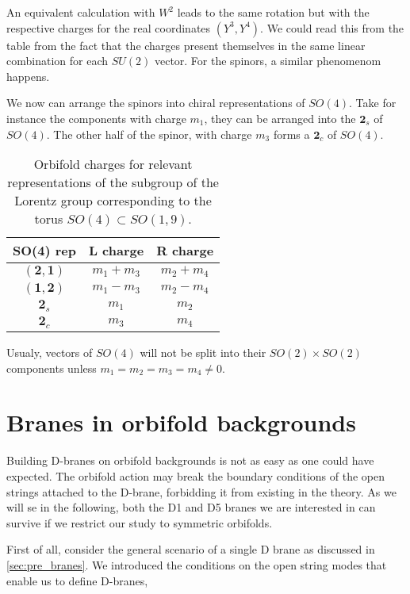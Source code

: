An equivalent calculation with $W^2$ leads to the same rotation but with the respective charges for the real coordinates $(Y^3, Y^4)$. We could read this from the table from the fact that the charges present themselves in the same linear combination for each $SU(2)$ vector. For the spinors, a similar phenomenom happens.

We now can arrange the spinors into chiral representations of $SO(4)$. Take for instance the components  with charge $m_1$, they can be arranged into the $\mathbf{2}_s$ of $SO(4)$. The other half of the spinor, with charge $m_3$ forms a $\mathbf{2}_c$ of $SO(4)$.

\begin{table}[h]
    \label{table:superimportant_orbifold_charges}
    \centering
    \begin{tabular}{ccc}
    SO(4) rep                 & L charge  & R charge  \\ \hline
    $(\mathbf{2},\mathbf{1})$ & $m_1+m_3$ & $m_2+m_4$ \\
    $(\mathbf{1},\mathbf{2})$ & $m_1-m_3$ & $m_2-m_4$ \\ \hline
    $\mathbf{2}_s$            & $m_1$     & $m_2$     \\
    $\mathbf{2}_c$            & $m_3$     & $m_4$    
\end{tabular}
\caption{Orbifold charges for relevant representations of the subgroup of the Lorentz group corresponding to the torus $SO(4)\subset SO(1,9)$.}
\end{table}

Usualy, vectors of $SO(4)$ will not be split into their $SO(2)\times SO(2)$ components unless $m_1 = m_2 = m_3 = m_4 \neq 0$.


\section{Branes in orbifold backgrounds}

Building D-branes on orbifold backgrounds is not as easy as one could have expected. The orbifold action may break the boundary conditions of the open strings attached to the D-brane, forbidding it from existing in the theory. As we will se in the following, both the D1 and D5 branes we are interested in can survive if we restrict our study to symmetric orbifolds.

First of all, consider the general scenario of a single D brane as discussed in \ref{sec:pre_branes}. We introduced the conditions on the open string modes that enable us to define D-branes,

